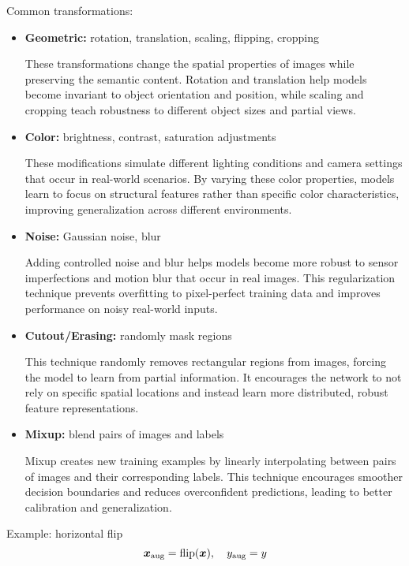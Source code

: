 Common transformations:
\begin{itemize}
    \item \textbf{Geometric:} rotation, translation, scaling, flipping, cropping
    
    These transformations change the spatial properties of images while preserving the semantic content. Rotation and translation help models become invariant to object orientation and position, while scaling and cropping teach robustness to different object sizes and partial views.
    
    \item \textbf{Color:} brightness, contrast, saturation adjustments
    
    These modifications simulate different lighting conditions and camera settings that occur in real-world scenarios. By varying these color properties, models learn to focus on structural features rather than specific color characteristics, improving generalization across different environments.
    
    \item \textbf{Noise:} Gaussian noise, blur
    
    Adding controlled noise and blur helps models become more robust to sensor imperfections and motion blur that occur in real images. This regularization technique prevents overfitting to pixel-perfect training data and improves performance on noisy real-world inputs.
    
    \item \textbf{Cutout/Erasing:} randomly mask regions
    
    This technique randomly removes rectangular regions from images, forcing the model to learn from partial information. It encourages the network to not rely on specific spatial locations and instead learn more distributed, robust feature representations.
    
    \item \textbf{Mixup:} blend pairs of images and labels
    
    Mixup creates new training examples by linearly interpolating between pairs of images and their corresponding labels. This technique encourages smoother decision boundaries and reduces overconfident predictions, leading to better calibration and generalization.
\end{itemize}

Example: horizontal flip
\begin{equation}
\boldsymbol{x}_{\text{aug}} = \text{flip}(\boldsymbol{x}), \quad y_{\text{aug}} = y
\end{equation}

